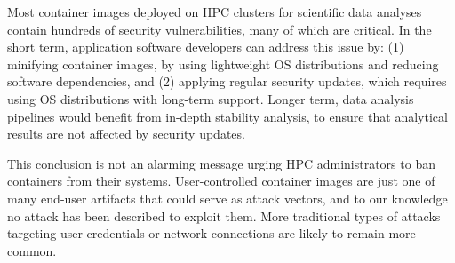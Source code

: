 \documentclass[a4paper,num-refs]{oup-contemporary}
\begin{document}
Most container images deployed on HPC clusters for scientific data analyses
contain hundreds of security vulnerabilities, many of which are critical.
In the short term, application software developers can address this issue
by: (1) minifying container images, by using lightweight OS distributions
and reducing software dependencies, and (2) applying regular security
updates, which requires using OS distributions with long-term support.
Longer term, data analysis pipelines would benefit from in-depth stability
analysis, to ensure that analytical results are not affected by security
updates.

This conclusion is not an alarming message urging HPC administrators  
to ban containers from their systems. User-controlled container images are
just one of many end-user artifacts that could serve as attack vectors, and
to our knowledge no attack has been described to exploit them. More
traditional types of attacks targeting user credentials or network
connections are likely to remain more common.


\end{document}
